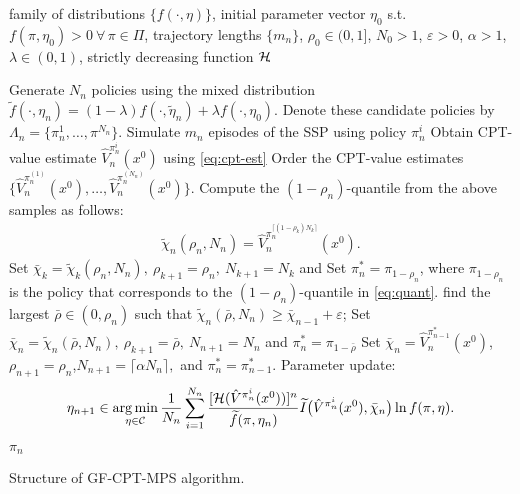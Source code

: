 \documentclass[11pt,letterpaper,english]{article}
\begin{document}
\begin{algorithm}
\begin{algorithmic}
  family of distributions $\{f(\cdot,\eta)\}$, initial parameter vector $\eta_0$ s.t. $f(\pi,\eta_0)>0 ~\forall\, \pi\in \Pi$, trajectory lengths $\{m_n\}$, 
$\rho_0 \in (0,1]$, $N_0>1$,
$\varepsilon> 0$, $\alpha>1$, $\lambda \in(0,1)$,
strictly decreasing function
$\mathcal{H}\hspace*{-3pt}$.

	\Candidate
	    \State 
	    Generate $N_n$ policies using the mixed distribution $\widetilde f(\cdot,\eta_n)= (1-\lambda)f(\cdot,\widetilde\eta_n)+\lambda f(\cdot,\eta_0)$. 
	    \State Denote these candidate policies by $\Lambda_n=\{\pi^1_n, \ldots, \pi^{N_n}\}$.
	\EndCandidate    
	\Estimation
	      \State Simulate $m_n$ episodes of the SSP using policy $\pi^i_n$
	      \State Obtain CPT-value estimate $\widehat V_n^{\pi^i_n}(x^0)$ using \eqref{eq:cpt-est}
	      \EndFor
	\EndEstimation
	\Elite
	  \State Order the CPT-value estimates\footnotemark[1] $\{\widehat V_n^{\pi^{(1)}_n}(x^0),\ldots,\widehat V_n^{\pi^{(N_n)}_n}(x^0)\}$. 
	  \State Compute the $(1-\rho_n)$-quantile from the above samples as follows: 
	  \begin{align}
\widetilde \chi_{n}(\rho_n,N_n) = \widehat V_n^{\pi^{\lceil(1-\rho_k)N_k \rceil}_n}(x^0).\label{eq:quant}
\end{align}
	\EndElite
	\Thresholding
	    \State Set $\bar \chi_{k} = \widetilde \chi_{k}(\rho_n,N_n),~\rho_{k+1} = \rho_n,~N_{k+1} = N_{k}$ and \label{step:3a}
	    \State Set $\pi^*_{n} = \pi_{1-\rho_{n}}$, where $\pi_{1-\rho_{n}}$ is the policy that corresponds to the $(1-\rho_n)$-quantile in \eqref{eq:quant}.
	\Else
             \State find the largest $\bar \rho \in (0, \rho_n)$ such that $\widetilde\chi_{n}(\bar \rho,N_n)\geq \bar\chi_{n-1}+\varepsilon$;             
              \State Set $\bar \chi_{n} = \widetilde \chi_{n}(\bar \rho,N_n),~ \rho_{k+1}  = \bar \rho,~N_{n+1} = N_{n}$ and
              $\pi^*_{n} = \pi_{1- \bar \rho}$ \label{step:3b}
              \Else
	      \State Set $\bar \chi_{n}  = \widehat V_n^{\pi^*_{n-1}}(x^0)$,$\rho_{n+1} = \rho_n$,$N_{n+1} = \lceil\alpha N_{n}\rceil,$ and
          $\pi^*_{n} = \pi^*_{n-1}$.\label{step:3c}
	      \EndIf
         \EndIf
	\EndThresholding
	    \Update
		\State Parameter update\footnotemark[2]:  
		                         \begin{equation*} 
\eta_{n+1} \in \mathop{\rm arg\,min}_{\eta \in \mathcal{C}}\frac{1}{N_n}\sum_{i=1}^{N_n}\frac{[\mathcal{H}(\hat V^{\pi^i_n}(x^0))]^n}{\widetilde f(\pi,\eta_n)}
\widetilde I\big(\hat V^{\pi^i_n}(x^0),\bar \chi_{n}\big) \ln f(\pi,\eta).
                            \end{equation*}

		\EndUpdate
\EndFor
{} $\pi_n$
\end{algorithmic}
\caption{Structure of  GF-CPT-MPS algorithm.}
\label{alg:mras}
\end{algorithm}
\end{document}
